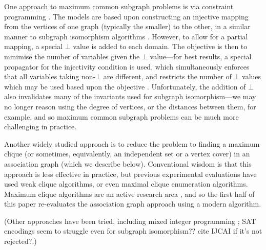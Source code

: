 \documentclass{llncs}
\begin{document}
One approach to maximum common subgraph problems is via constraint programming
\cite{DBLP:conf/mco/VismaraV08,DBLP:conf/cp/NdiayeS11}. The models are based upon constructing an
injective mapping from the vertices of one graph (typically the smaller) to the other, in a similar
manner to subgraph isomorphism algorithms
\cite{DBLP:journals/ai/Solnon10,DBLP:conf/cp/AudemardLMGP14,DBLP:conf/cp/McCreeshP15}. However, to
allow for a partial mapping, a special $\bot$ value is added to each domain. The objective is then
to minimise the number of variables given the $\bot$ value---for best results, a special propagator
for the injectivity condition is used, which simultaneously enforces that all variables taking
non-$\bot$ are different, and restricts the number of $\bot$ values which may be used based upon the
objective \cite{DBLP:conf/cp/PetitRB01}.  Unfortunately, the addition of $\bot$ also invalidates
many of the invariants used for subgraph isomorphism---we may no longer reason using the degree of
vertices, or the distances between them, for example, and so maximum common subgraph problems can be
much more challenging in practice.

Another widely studied approach is to reduce the problem to finding a maximum clique (or sometimes,
equivalently, an independent set or a vertex cover) in an association graph (which we describe
below). Conventional wisdom is that this approach is less effective in practice, but previous
experimental evaluations have used weak clique algorithms, or even maximal clique enumeration
algorithms. Maximum clique algorithms are an active research area
\cite{DBLP:conf/dmtcs/TomitaS03,DBLP:journals/jgo/TomitaK07,DBLP:conf/walcom/TomitaSHTW10,DBLP:journals/cor/SegundoRJ11,DBLP:journals/algorithms/Prosser12,DBLP:journals/ol/SegundoMRH13,DBLP:conf/ictai/LiFX13,DBLP:journals/cor/SegundoT14,DBLP:conf/lion/SegundoLB14,DBLP:conf/cp/McCreeshP14,DBLP:journals/jco/BatsynGMP14,DBLP:journals/cor/SegundoNB15,DBLP:conf/lion/NikolaevBS15,DBLP:conf/lion/LiJX15,DBLP:journals/jcc/KoncDTRJ12,DBLP:journals/algorithms/McCreeshP13,DBLP:journals/topc/McCreeshP15,DBLP:journals/cor/SegundoLP16},
and so the first half of this paper re-evaluates the association graph approach using a modern
algorithm.

(Other approaches have been tried, including mixed integer programming
\cite{DBLP:journals/anor/PivaS12}; SAT encodings seem to struggle even for subgraph isomorphism??
cite IJCAI if it's not rejected?.)
\end{document}

